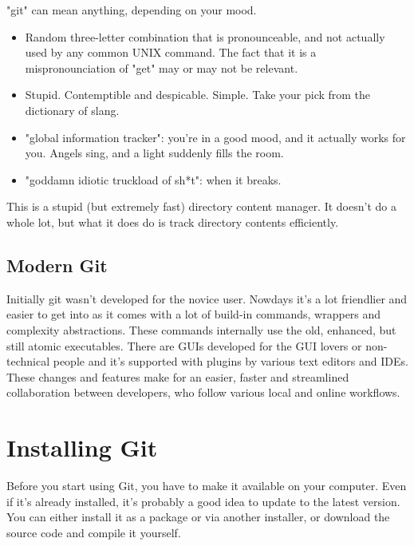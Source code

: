 \documentclass[12pt,a4]{article}
\begin{document}
"git" can mean anything, depending on your mood.
\begin{itemize}
\vspace*{-10pt}
\item Random three-letter combination that is pronounceable, and not actually
	used by any common UNIX command. The fact that it is a mispronounciation of
	"get" may or may not be relevant.
\vspace*{-3pt}
\item Stupid. Contemptible and despicable. Simple. Take your pick from the
	dictionary of slang.
\vspace*{-3pt}
\item "global information tracker": you're in a good mood, and it actually
   works for you. Angels sing, and a light suddenly fills the room.
\vspace*{-3pt}
\item "goddamn idiotic truckload of sh*t": when it breaks.
\vspace*{-10pt}
\end{itemize}

This is a stupid (but extremely fast) directory content manager. It doesn't do
a whole lot, but what it does do is track directory contents efficiently.

\subsection{Modern Git}
Initially git wasn't developed for the novice user. Nowdays it's a lot
friendlier and easier to get into as it comes with a lot of build-in commands,
wrappers and complexity abstractions. These commands internally use the old,
enhanced, but still atomic executables. There are GUIs developed for the GUI
lovers or non-technical people and it's supported with plugins by various text
editors and IDEs. These changes and features make for an easier, faster and
streamlined collaboration between developers, who follow various local and
online workflows.

\section{Installing Git}
Before you start using Git, you have to make it available on your computer. Even
if it’s already installed, it’s probably a good idea to update to the latest
version. You can either install it as a package or via another installer, or
download the source code and compile it yourself.
\end{document}
